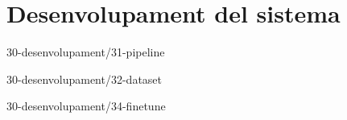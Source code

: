 \chapter{Desenvolupament del sistema}

{30-desenvolupament/31-pipeline}

{30-desenvolupament/32-dataset}


{30-desenvolupament/34-finetune}






\begin{comment}
3 Desenvolupament del sistema
    3.1 Arquitectura del sistema (pipeline)
    3.2 Creació dataset sintètic
    [?] 3.3 Creació de tests
    3.4 Fine-tune sintètic
    3.5 Dataset i fine-tune amb dades reals
        3.5.1 Estadístiques descriptives
        3.5.2 Tendències i patrons
        3.5.3 Problemes i incidències comunes
        3.5.4 Anomalies i valors atípics
    3.6 Desplegament API
\end{comment}
